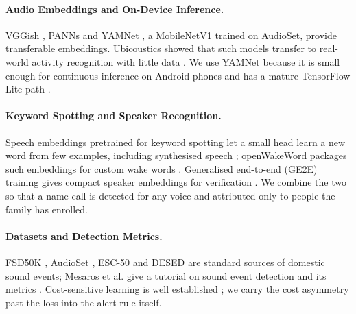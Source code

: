 \documentclass{svproc}
\begin{document}
\paragraph{Audio Embeddings and On-Device Inference.} VGGish \cite{hershey2017}, PANNs \cite{kong2020} and YAMNet \cite{yamnet}, a MobileNetV1 \cite{howard2017} trained on AudioSet, provide transferable embeddings. Ubicoustics showed that such models transfer to real-world activity recognition with little data \cite{laput2018}. We use YAMNet because it is small enough for continuous inference on Android phones and has a mature TensorFlow Lite path \cite{jacob2018}.

\paragraph{Keyword Spotting and Speaker Recognition.} Speech embeddings pretrained for keyword spotting let a small head learn a new word from few examples, including synthesised speech \cite{lin2020}; openWakeWord packages such embeddings for custom wake words \cite{openwakeword}. Generalised end-to-end (GE2E) training gives compact speaker embeddings for verification \cite{wan2018}. We combine the two so that a name call is detected for any voice and attributed only to people the family has enrolled.

\paragraph{Datasets and Detection Metrics.} FSD50K \cite{fonseca2022}, AudioSet \cite{gemmeke2017}, ESC-50 \cite{piczak2015} and DESED \cite{turpault2019} are standard sources of domestic sound events; Mesaros et al. give a tutorial on sound event detection and its metrics \cite{mesaros2021}. Cost-sensitive learning is well established \cite{elkan2001}; we carry the cost asymmetry past the loss into the alert rule itself.

\end{document}
